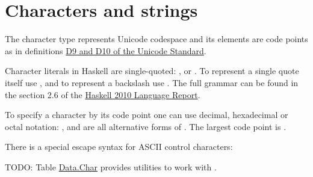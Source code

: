 \section{Characters and strings}
\begin{haddockdesc}
\item[\begin{tabular}{@{}l}
data Char
\end{tabular}]
{\haddockbegindoc
The character type  represents Unicode codespace
and its elements are code points as in definitions
\href{https://www.unicode.org/versions/Unicode15.0.0/ch03.pdf#G2212}{D9 and D10 of the Unicode Standard}.\par
Character literals in Haskell are single-quoted: ,  or .
To represent a single quote itself use , and to represent a backslash
use . The full grammar can be found in the section 2.6 of the
\href{https://www.haskell.org/definition/haskell2010.pdf#section.2.6}{Haskell 2010 Language Report}.\par
To specify a character by its code point one can use decimal, hexadecimal
or octal notation: ,  and  are all alternative forms
of . The largest code point is .\par
There is a special escape syntax for ASCII control characters:\par
{TODO: Table}
\href{https://hackage.haskell.org/package/base/docs/Data-Char.html}{Data.Char} provides utilities to work with .\par}
\end{haddockdesc}
\begin{haddockdesc}
\item[\begin{tabular}{@{}l}
instance IsChar Char\\instance PrintfArg Char\\instance Storable Char\\instance Ix Char\\instance Read Char\\instance Show Char\\instance Eq Char\\instance Ord Char\\instance IArray UArray Char\\instance MArray IOUArray Char IO\\instance Foldable (UChar :: Type -> Type)\\instance Traversable (UChar :: Type -> Type)\\instance MArray STUArray s Char ST s
\end{tabular}]
\end{haddockdesc}
